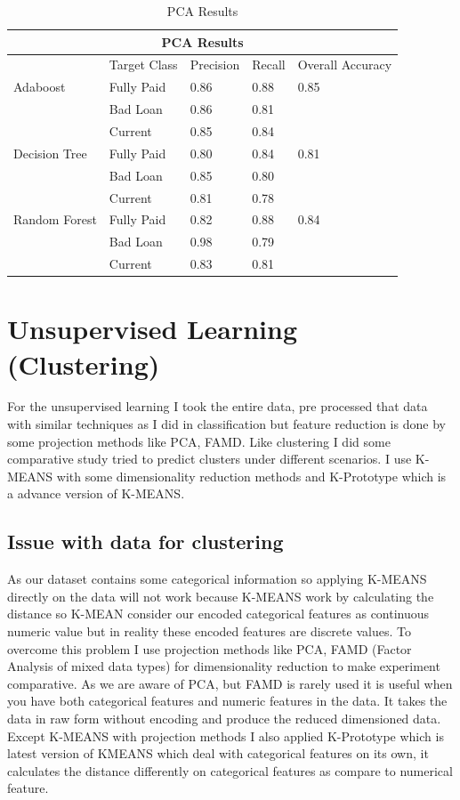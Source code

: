 \documentclass[12pt]{article}
\begin{document}
\begin{table}[h!]
	\centering
	\begin{tabular}{ |p{3cm}||p{2cm}|p{2cm}|p{2cm}|p{2cm}|  }
		\hline
		\multicolumn{5}{|c|}{PCA Results} \\
		\hline
		& Target Class & Precision & Recall & Overall Accuracy \\
		\hline
		Adaboost & Fully Paid &0.86 & 0.88 & 0.85\\
		& Bad Loan & 0.86 & 0.81 & \\
		& Current & 0.85 & 0.84 & \\
		\hline
		Decision Tree & Fully Paid & 0.80 & 0.84 & 0.81\\
		& Bad Loan & 0.85 &  0.80 & \\
		& Current &0.81 &  0.78 & \\
		\hline
		Random Forest & Fully Paid & 0.82 & 0.88 & 0.84\\
		& Bad Loan &0.98  & 0.79 & \\
		& Current & 0.83 & 0.81 & \\
		\hline
	\end{tabular}
	\caption{PCA Results}
	\label{table:pca_results}
\end{table}

\section{Unsupervised Learning (Clustering)}
For the unsupervised learning I took the entire data, pre processed that data with similar techniques as I did in classification but feature reduction is done by some projection methods like PCA, FAMD. Like clustering I did some comparative study tried to predict clusters under different scenarios. I use K-MEANS with some dimensionality reduction methods and K-Prototype which is a advance version of K-MEANS.
\subsection{Issue with data for clustering}
As our dataset contains some categorical information so applying K-MEANS directly on the data will not work because K-MEANS work by calculating the distance so K-MEAN consider our encoded categorical features as continuous numeric value but in reality these encoded features are discrete values. To overcome this problem I use projection methods like PCA, FAMD (Factor Analysis of mixed data types) for dimensionality reduction to make experiment comparative. As we are aware of PCA, but FAMD is rarely used it is useful when you have both categorical features and numeric features in the data. It takes the data in raw form without encoding and produce the reduced dimensioned data. Except K-MEANS with projection methods I also applied K-Prototype which is latest version of KMEANS which deal with categorical features on its own, it calculates the distance differently on categorical features as compare to numerical feature.
\end{document}
